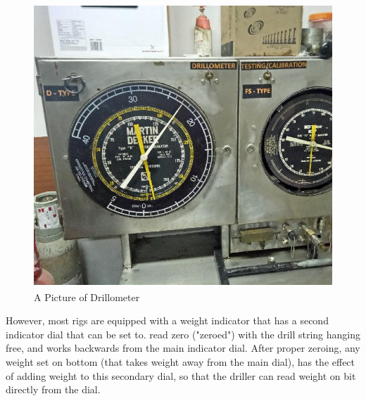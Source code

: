 \begin{figure}[h]
\includegraphics[scale=0.3]{images/drillometer}
\centering 
\caption{A Picture of Drillometer}
\end{figure}

\vspace{2em}


 However, most rigs are equipped with a
weight indicator that has a second indicator dial that can be set to.
read zero ("zeroed") with the drill string hanging free, and works
backwards from the main indicator dial. After proper zeroing, any
weight set on bottom (that takes weight away from the main dial), has
the effect of adding weight to this secondary dial, so that the driller
can read weight on bit directly from the dial.